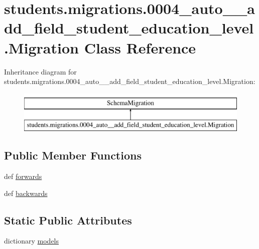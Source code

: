 \hypertarget{classstudents_1_1migrations_1_10004__auto____add__field__student__education__level_1_1_migration}{\section{students.\-migrations.0004\-\_\-auto\-\_\-\-\_\-add\-\_\-field\-\_\-student\-\_\-education\-\_\-level.Migration Class Reference}
\label{classstudents_1_1migrations_1_10004__auto____add__field__student__education__level_1_1_migration}
}
Inheritance diagram for students.\-migrations.0004\-\_\-auto\-\_\-\-\_\-add\-\_\-field\-\_\-student\-\_\-education\-\_\-level.Migration\-:\begin{figure}[H]
\begin{center}
\leavevmode
\includegraphics[height=2.000000cm]{classstudents_1_1migrations_1_10004__auto____add__field__student__education__level_1_1_migration}
\end{center}
\end{figure}
\subsection*{Public Member Functions}
\begin{DoxyCompactItemize}
\item 
def \hyperlink{classstudents_1_1migrations_1_10004__auto____add__field__student__education__level_1_1_migration_a943692e13dee282cb162e64d0c0b268b}{forwards}
\item 
def \hyperlink{classstudents_1_1migrations_1_10004__auto____add__field__student__education__level_1_1_migration_a24114a5c2f9de7676ba5e5d8fc70406c}{backwards}
\end{DoxyCompactItemize}
\subsection*{Static Public Attributes}
\begin{DoxyCompactItemize}
\item 
dictionary \hyperlink{classstudents_1_1migrations_1_10004__auto____add__field__student__education__level_1_1_migration_a52c034bfca3afbfe91f1d98ee4690657}{models}
\end{DoxyCompactItemize}


